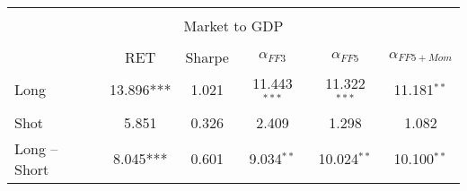 \begin{table}[!htbp]
\begin{adjustbox}{width=\textwidth,max height=.43\totalheight}
\begin{tabular}{lccccc}
		\hline\\[-1.8ex]
		\multicolumn{6}{c}{Market to GDP}\\
		\hline\\[-1.8ex]
		 & RET & Sharpe & $\alpha_{FF3}$ & $\alpha_{FF5}$ & $\alpha_{FF5+Mom}$ \\
		 \cline{2-6}
		Long & 13.896*** & 1.021 & 11.443$^{***}$ & 11.322$^{***}$ & 11.181$^{**}$ \\
		Shot & 5.851 & 0.326 & 2.409 & 1.298 & 1.082 \\
		Long $–$ Short & 8.045*** & 0.601 & 9.034$^{**}$ & 10.024$^{**}$ & 10.100$^{**}$\\
		\hline
	\end{tabular}
	\end{adjustbox}
	
\end{table}